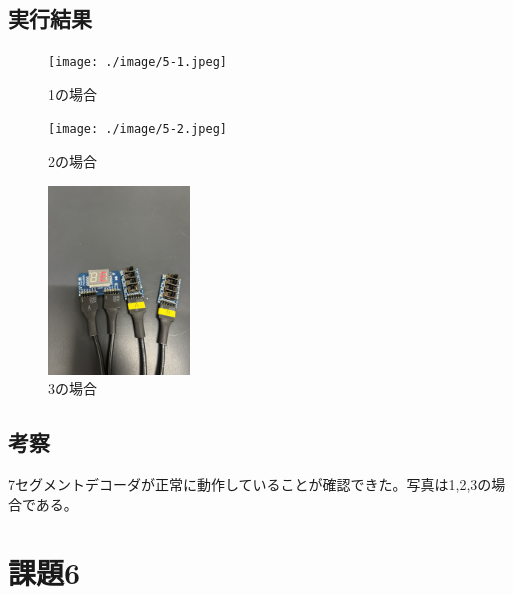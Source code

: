 \documentclass[uplatex]{jsarticle}
\begin{document}
\subsection{実行結果}
\begin{figure}[hbtp]
  \centering
  \texttt{[image: ./image/5-1.jpeg]}
  \caption{1の場合}
  \label{ラベル}
\end{figure}
\begin{figure}[hbtp]
  \centering
  \texttt{[image: ./image/5-2.jpeg]}
  \caption{2の場合}
  \label{ラベル}
\end{figure}
\begin{figure}[hbtp]
  \centering
  \includegraphics[height=5cm]
    {./image/5-3.jpeg}
  \caption{3の場合}
  \label{ラベル}
\end{figure}

\subsection{考察}
7セグメントデコーダが正常に動作していることが確認できた。写真は1,2,3の場合である。

\section{課題6}
\end{document}
